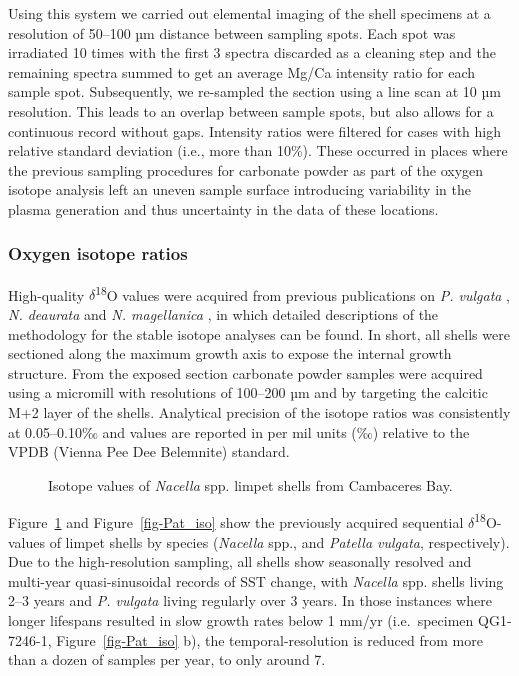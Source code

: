 \documentclass[
  authoryear,
  preprint,
  3p]{elsarticle}
\begin{document}
Using this system we carried out elemental imaging of the shell
specimens at a resolution of 50--100 µm distance between sampling spots.
Each spot was irradiated 10 times with the first 3 spectra discarded as
a cleaning step and the remaining spectra summed to get an average Mg/Ca
intensity ratio for each sample spot. Subsequently, we re-sampled the
section using a line scan at 10 µm resolution. This leads to an overlap
between sample spots, but also allows for a continuous record without
gaps. Intensity ratios were filtered for cases with high relative
standard deviation (i.e., more than 10\%). These occurred in places
where the previous sampling procedures for carbonate powder as part of
the oxygen isotope analysis left an uneven sample surface introducing
variability in the plasma generation and thus uncertainty in the data of
these locations.

\subsubsection{Oxygen isotope ratios}\label{oxygen-isotope-ratios}

High-quality \(\delta\)\textsuperscript{18}O values were acquired from
previous publications on \emph{P. vulgata}
\citep{Surge2012-ba, Graniero2017-io}, \emph{N. deaurata} and \emph{N.
magellanica} \citep{Nicastro2020-ih}, in which detailed descriptions of
the methodology for the stable isotope analyses can be found. In short,
all shells were sectioned along the maximum growth axis to expose the
internal growth structure. From the exposed section carbonate powder
samples were acquired using a micromill with resolutions of 100--200 µm
and by targeting the calcitic M+2 layer of the shells. Analytical
precision of the isotope ratios was consistently at 0.05--0.10‰ and
values are reported in per mil units (‰) relative to the VPDB (Vienna
Pee Dee Belemnite) standard.

\begin{figure}


\caption{\label{fig-Nac_iso}Isotope values of \emph{Nacella} spp. limpet
shells from Cambaceres Bay.}

\end{figure}%

Figure~\ref{fig-Nac_iso} and Figure~\ref{fig-Pat_iso} show the
previously acquired sequential \(\delta\)\textsuperscript{18}O-values of
limpet shells by species (\emph{Nacella} spp., and \emph{Patella
vulgata}, respectively). Due to the high-resolution sampling, all shells
show seasonally resolved and multi-year quasi-sinusoidal records of SST
change, with \emph{Nacella} spp. shells living 2--3 years and \emph{P.
vulgata} living regularly over 3 years. In those instances where longer
lifespans resulted in slow growth rates below 1 mm/yr (i.e.~specimen
QG1-7246-1, Figure~\ref{fig-Pat_iso} b), the temporal-resolution is
reduced from more than a dozen of samples per year, to only around 7.
\end{document}
